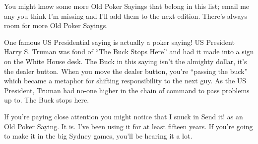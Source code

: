 You might know some more Old Poker Sayings that belong in this list;
email me any you think I'm missing and I'll add them to the next
edition. There's always room for more Old Poker Sayings.

One famous US Presidential saying is actually a poker saying!
US President Harry S. Truman was fond of ``The Buck Stops Here'' and
had it made into a sign on the White House desk. The Buck in
this saying isn't the almighty dollar, it's the dealer button. When
you move the dealer button, you're ``passing the buck'' which became a
metaphor for shifting responsibility to the next guy. As the US
President, Truman had no-one higher in the chain of command to pass
problems up to. The Buck stops here.

If you're paying close attention you might notice that I snuck in
Send it! as an Old Poker Saying. It is. I've been using it for at
least fifteen years. If you're going to make it in the big Sydney
games, you'll be hearing it a lot.
